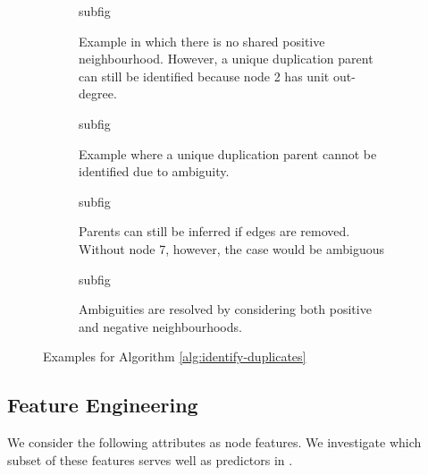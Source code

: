 \documentclass[
	fontsize=10pt, %
	twoside=false, %
	secnumdepth=1, %
]{kaobook}
\begin{document}
\begin{figure}[h]
  \centering
  \begin{subfigure}{0.23\textwidth}
    subfig
    \caption{Example in which there is no shared positive neighbourhood.
      However, a unique duplication parent can still be identified because node
      2 has unit out-degree.}
    \label{fig:ex-no-neighb}
  \end{subfigure}
  \begin{subfigure}{0.23\textwidth}
    subfig
    \caption{Example where a unique duplication parent cannot be identified
      due to ambiguity.}
    \label{fig:ex-p-1}
  \end{subfigure}
  \begin{subfigure}{0.23\textwidth}
    subfig
    \caption{Parents can still be inferred if edges are removed. Without node 7,
    however, the case would be ambiguous}
    \label{fig:ex-remove-edge}
  \end{subfigure}
  \begin{subfigure}{0.23\textwidth}
    subfig
    \caption{Ambiguities are resolved by considering both positive and negative neighbourhoods.}
    \label{fig:ex-ambig1}
  \end{subfigure}
  \caption{Examples for Algorithm \ref{alg:identify-duplicates}}
  \label{fig:alg-examples}
\end{figure}

\subsection{Feature Engineering}
\label{sec:feature-selection}


We consider the following attributes as node features. We investigate which
subset of these features serves well as predictors in .
\end{document}
